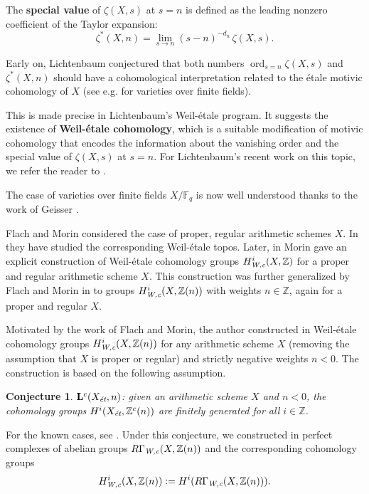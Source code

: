 \documentclass[10pt,a4paper,oneside]{article}
\DeclareMathOperator{\ord}{ord}
\newcommand{\FF}{\mathbb{F}}
\newcommand{\ZZ}{\mathbb{Z}}
\newcommand{\et}{\text{\it \'{e}t}}
\newcommand{\Wc}{\text{\it W,c}}
\newcommand{\dfn}{\mathrel{\mathop:}=}
\theoremstyle{myplain}
\theoremstyle{mydefinition}
\newtheorem*{conjecture*}{Conjecture}
\numberwithin{equation}{section}
\begin{document}
The \textbf{special value} of $\zeta (X,s)$ at $s = n$ is defined as the leading
nonzero coefficient of the Taylor expansion:
$$\zeta^* (X,n) = \lim_{s \to n} (s - n)^{-d_n}\,\zeta (X,s).$$

Early on, Lichtenbaum conjectured that both numbers $\ord_{s = n} \zeta (X,s)$
and $\zeta^* (X,n)$ should have a cohomological interpretation related to the
\'{e}tale motivic cohomology of $X$ (see e.g. \cite{Lichtenbaum-1984} for
varieties over finite fields).

This is made precise in Lichtenbaum's Weil-\'{e}tale program. It suggests the
existence of \textbf{Weil-\'{e}tale cohomology}, which is a suitable
modification of motivic cohomology that encodes the information about the
vanishing order and the special value of $\zeta (X,s)$ at $s = n$.
For Lichtenbaum's recent work on this topic, we refer the reader to
\cite{Lichtenbaum-2005,Lichtenbaum-2009-Euler-char,Lichtenbaum-2009-number-rings,Lichtenbaum-2021}.

The case of varieties over finite fields $X/\FF_q$ is now well understood thanks
to the work of Geisser
\cite{Geisser-2004,Geisser-2006,Geisser-2010-arithmetic-homology}.

Flach and Morin considered the case of proper, regular arithmetic schemes
$X$. In \cite{Flach-Morin-2012} they have studied the corresponding
Weil-\'{e}tale topos. Later, in \cite{Morin-2014} Morin gave an explicit
construction of Weil-\'{e}tale cohomology groups $H^i_\Wc (X, \ZZ)$ for a proper
and regular arithmetic scheme $X$. This construction was further generalized by
Flach and Morin in \cite{Flach-Morin-2018} to groups $H^i_\Wc (X, \ZZ(n))$ with
weights $n \in \ZZ$, again for a proper and regular $X$.

Motivated by the work of Flach and Morin, the author constructed in
\cite{Beshenov-Weil-etale-1} Weil-\'{e}tale cohomology groups
$H^i_\Wc (X, \ZZ (n))$ for any arithmetic scheme $X$ (removing the assumption
that $X$ is proper or regular) and strictly negative weights $n < 0$.
The construction is based on the following assumption.

\begin{conjecture*}
  $\mathbf{L}^c (X_\et,n)$: given an arithmetic scheme $X$ and $n < 0$, the
  cohomology groups $H^i (X_\et, \ZZ^c (n))$ are finitely generated for all
  $i \in \ZZ$.
\end{conjecture*}

For the known cases, see \cite[\S 8]{Beshenov-Weil-etale-1}. Under this
conjecture, we constructed in \cite[\S 7]{Beshenov-Weil-etale-1} perfect
complexes of abelian groups $R\Gamma_\Wc (X, \ZZ(n))$ and the corresponding
cohomology groups
$$H^i_\Wc (X, \ZZ(n)) \dfn H^i (R\Gamma_\Wc (X, \ZZ(n))).$$
\end{document}
